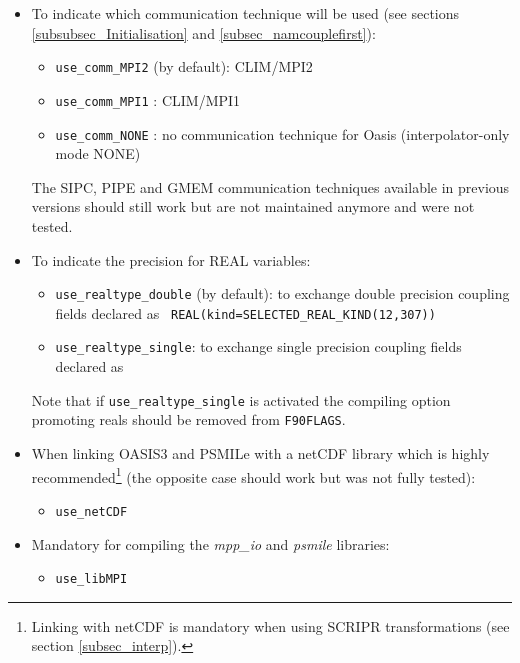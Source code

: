 \begin{itemize}

\item To indicate which communication technique will be used
  (see sections \ref{subsubsec_Initialisation} and \ref{subsec_namcouplefirst}):

  \begin{itemize}
  \item {\tt use\_comm\_MPI2} (by default): CLIM/MPI2 
  \item {\tt use\_comm\_MPI1} : CLIM/MPI1
  \item {\tt use\_comm\_NONE} : no communication technique for Oasis
    (interpolator-only mode NONE)
  \end{itemize}
  The SIPC, PIPE and GMEM communication techniques available in
  previous versions should still work but are not maintained anymore
  and were not tested.

\item To indicate the precision for REAL variables:

  \begin{itemize}
  \item {\tt use\_realtype\_double} (by default): to exchange double
    precision coupling fields declared as {\tt
      REAL(kind=SELECTED\_REAL\_KIND(12,307))}
  \item {\tt use\_realtype\_single}: to exchange single precision coupling
    fields declared as 
  \end{itemize}
  Note that if {\tt use\_realtype\_single} is activated the compiling
  option promoting reals should be removed from {\tt F90FLAGS}.

\item When linking OASIS3 and PSMILe with a netCDF library which is
  highly recommended\footnote{Linking with netCDF is mandatory when
    using SCRIPR transformations (see section \ref{subsec_interp}).}
  (the opposite case should work but was not fully tested): 
  \begin{itemize}
  \item{\tt use\_netCDF}
  \end{itemize}

\item Mandatory for compiling the {\it mpp\_io} and {\it psmile}
  libraries:
  \begin{itemize}
  \item{\tt use\_libMPI}
  \end{itemize}


\end{itemize}
